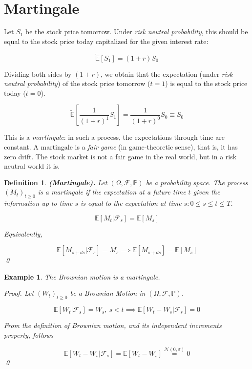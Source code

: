 \documentclass[oneside,titlepage,headinclude,12pt,a4paper,BCOR5mm,footinclude]{book}
\theoremstyle{defn}
\newtheorem{defn}{Definition}
\newtheorem{example}{Example}
\begin{document}
\section{Martingale}

Let $S_1$ be the stock  price tomorrow. Under \textit{risk neutral probability},
this should be equal to the stock price today capitalized for the given interest
rate:

\[
  \mathbb{\tilde E} [S_1] = (1+r)S_0
\]

Dividing  both  sides  by  $(1+r)$,   we  obtain  that  the  expectation  (under
\textit{risk neutral probability}) of the  stock price tomorrow ($t=1$) is equal
to the stock price today ($t=0$).

\[
  \mathbb{\tilde E}\left[ \frac{1}{(1+r)^1} S_1 \right] = \frac{1}{(1+r)^0} S_0 \equiv S_0
\]

This is a \textit{martingale}: in such  a process, the expectations through time
are constant.  A martingale is  a \textit{fair game} (in  game-theoretic sense),
that is,  it has zero  drift. The stock  market is not a  fair game in  the real
world, but in a risk neutral world it is.

\begin{defn}\textbf{(Martingale).} 
  Let  $(\Omega,\mathcal{F},\mathbb{P})$ be  a  probability  space. The  process
  $(M_t)_{t\geq 0}$ is a \textit{martingale} if the expectation at a future time
  $t$ given the information  up to time $s$ is equal to  the expectation at time
  $s : 0 \leq s \leq t \leq T$.

  \[
    \mathbb{E}[M_{t} | \mathcal{F}_s] = \mathbb{E}[M_s]
  \]

  Equivalently,
  
  \[
    \mathbb{E}[M_{s+ds} | \mathcal{F}_s] = M_s 
    \implies
    \mathbb{E}[M_{s+ds}] = \mathbb{E}[M_{s}] 
  \]
  \qed
\end{defn}

\begin{example} The Brownian motion is a martingale.

  \textit{Proof}.  Let  $(W_t)_{t\geq 0}$  be  a  Brownian Motion  in  $(\Omega,
  \mathcal{F}, \mathbb{P})$.

  \[
    \mathbb{E}[W_t|\mathcal{F}_s] = W_s,\ s < t \implies
    \mathbb{E}[W_t-W_s|\mathcal{F}_s] = 0
  \]

  From  the  definition  of  Brownian motion,  and  its  independent  increments
  property, follows

  \[
    \mathbb{E}[W_t-W_s|\mathcal{F}_s] = \mathbb{E}[W_t-W_s] \stackrel{\mathcal{N}(0,\sigma)}{=} 0
  \]
  \qed
\end{example}
\end{document}
